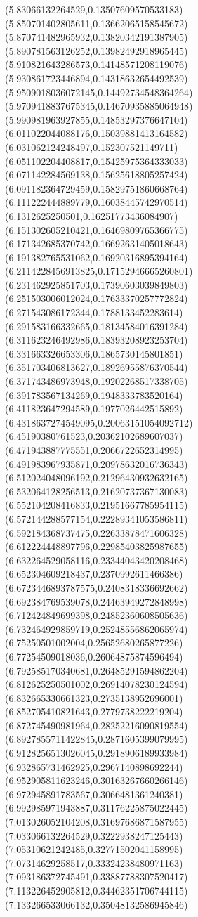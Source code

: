 {(5.83066132264529,0.13507609570533183)
(5.850701402805611,0.13662065158545672)
(5.870741482965932,0.13820342191387905)
(5.890781563126252,0.13982492918965445)
(5.910821643286573,0.14148571208119076)
(5.930861723446894,0.14318632654492539)
(5.9509018036072145,0.14492734548364264)
(5.9709418837675345,0.14670935885064948)
(5.990981963927855,0.14853297376647104)
(6.011022044088176,0.15039881413164582)
(6.031062124248497,0.152307521149711)
(6.051102204408817,0.15425975364333033)
(6.071142284569138,0.15625618805257424)
(6.091182364729459,0.15829751860668764)
(6.111222444889779,0.16038445742970514)
(6.1312625250501,0.16251773436084907)
(6.151302605210421,0.16469809765366775)
(6.171342685370742,0.16692631405018643)
(6.191382765531062,0.16920316895394164)
(6.2114228456913825,0.17152946665260801)
(6.231462925851703,0.17390603039849803)
(6.251503006012024,0.17633370257772824)
(6.271543086172344,0.1788133452283614)
(6.291583166332665,0.18134584016391284)
(6.311623246492986,0.18393208923253704)
(6.331663326653306,0.1865730145801851)
(6.351703406813627,0.18926955876370544)
(6.371743486973948,0.19202268517338705)
(6.391783567134269,0.1948333783520164)
(6.411823647294589,0.1977026442515892)
(6.4318637274549095,0.20063151054092712)
(6.45190380761523,0.20362102689607037)
(6.471943887775551,0.2066722652314995)
(6.491983967935871,0.20978632016736343)
(6.512024048096192,0.21296430932632165)
(6.532064128256513,0.21620737367130083)
(6.552104208416833,0.21951667785954115)
(6.572144288577154,0.22289341053586811)
(6.592184368737475,0.22633878471606328)
(6.612224448897796,0.22985403825987655)
(6.632264529058116,0.23344043420208468)
(6.652304609218437,0.2370992611466386)
(6.6723446893787575,0.2408318336692662)
(6.692384769539078,0.24463949272848998)
(6.712424849699398,0.24852360608505636)
(6.732464929859719,0.25248556862065974)
(6.75250501002004,0.25652680265877226)
(6.77254509018036,0.26064875874596494)
(6.792585170340681,0.26485291594862204)
(6.812625250501002,0.26914078230124594)
(6.832665330661323,0.2735138952696001)
(6.852705410821643,0.2779738222219204)
(6.872745490981964,0.28252216090819554)
(6.8927855711422845,0.2871605399079995)
(6.9128256513026045,0.2918906189933984)
(6.932865731462925,0.2967140898692244)
(6.952905811623246,0.30163267660266146)
(6.972945891783567,0.3066481361240381)
(6.992985971943887,0.31176225875022445)
(7.013026052104208,0.31697686871587955)
(7.033066132264529,0.3222938247125443)
(7.05310621242485,0.32771502041158995)
(7.07314629258517,0.33324238480971163)
(7.093186372745491,0.33887788307520417)
(7.113226452905812,0.34462351706744115)
(7.133266533066132,0.35048132586945846)
}
